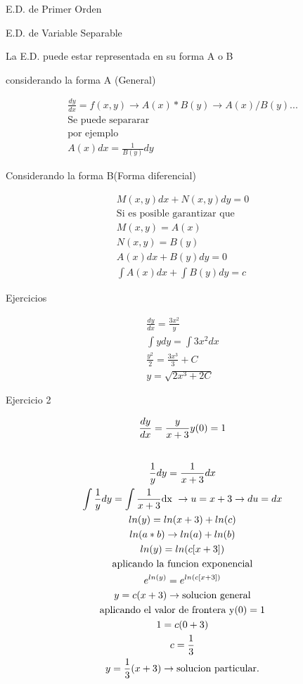 \documentclass{article}
\begin{document}
E.D.  de Primer Orden

E.D.  de Variable Separable

La E.D. puede estar representada en su forma A o B

considerando la forma A (General)




\begin{gather*}
\frac{dy}{dx} = f(x,y)  \rightarrow  A(x)*B(y)  \rightarrow  A(x)/B(y)... \\
\text{Se puede separarar} \\
\text{por ejemplo} \\
A(x)dx =\frac{1}{B(y)}dy
\end{gather*}


Considerando la forma B(Forma diferencial)




\begin{gather*}
M(x,y)dx + N(x,y)dy = 0 \\
\text{Si es posible garantizar que} \\
M(x,y) = A(x) \\
N(x,y) = B(y) \\
A(x)dx+B(y)dy = 0 \\
\int A(x)dx+\int B(y)dy = c
\end{gather*}


Ejercicios


\begin{gather*}
\frac{dy}{dx}=\frac{3x^{2}}{y} \\
\int ydy = \int 3x^{2}dx \\
\frac{y^{2}}{2} = \frac{3x^{3}}{3} + C \\
y = \sqrt{2x^{3}+2C}
\end{gather*}


Ejercicio 2




\begin{gather*}
\frac{dy}{dx}=\frac{y}{x+3}     y(0)=1 \\
\vspace{0.5em} \\
\frac{1}{y}dy = \frac{1}{x+3}dx \\
\int \frac{1}{y}dy = \int \frac{1}{x+3}\text{dx      } \rightarrow  u=x+3   \rightarrow  du =dx \\
ln(y) = ln(x+3)+ln(c) \\
ln(a*b)  \rightarrow ln(a)+ln(b) \\
ln(y) = ln(c[x+3]) \\
\text{aplicando la funcion exponencial} \\
e^{ln(y)} = e^{ln(c[x+3])} \\
y = c(x+3)  \rightarrow \text{solucion general} \\
\text{aplicando el valor de frontera  y}(0)=1 \\
1 = c(0 +3) \\
c = \frac{1}{3} \\
y = \frac{1}{3}(x+3)  \rightarrow \text{solucion particular.}
\end{gather*}
\end{document}
